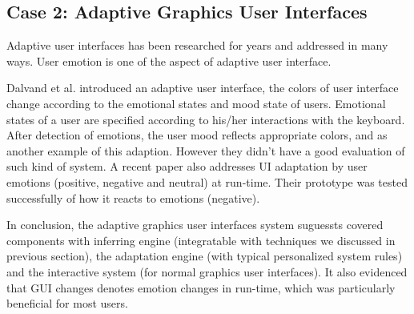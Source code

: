 \subsection{Case 2: Adaptive Graphics User Interfaces}
Adaptive user interfaces has been researched for years \cite{schneider1993adaptive} and addressed in many ways. User emotion is one of the aspect of adaptive user interface.

Dalvand et al.\cite{Dalvand} introduced an adaptive user interface, the colors of user interface change according to the emotional states and mood state of users. Emotional states of a user are specified according to his/her interactions with the keyboard. After detection of emotions, the user mood reflects appropriate colors, and \cite{Kaiser2006} as another example of this adaption. However they didn't have a good evaluation of such kind of system.
A recent paper \cite{Galindo} also addresses UI adaptation by user emotions (positive, negative and neutral) at run-time. Their prototype was tested successfully of how it reacts to emotions (negative).

In conclusion, the adaptive graphics user interfaces system suguessts covered components with inferring engine (integratable with techniques we discussed in previous section), the adaptation engine (with typical personalized system rules) and the interactive system (for normal graphics user interfaces). It also evidenced that GUI changes denotes emotion changes in run-time, which was particularly beneficial for most users.


